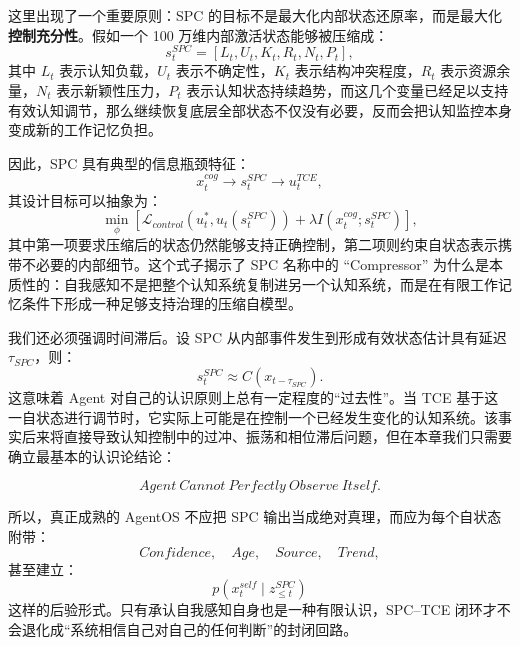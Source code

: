 这里出现了一个重要原则：SPC 的目标不是最大化内部状态还原率，而是最大化\textbf{控制充分性}。假如一个 100 万维内部激活状态能够被压缩成：
\begin{equation}
s_t^{SPC}
=
[
L_t,
U_t,
K_t,
R_t,
N_t,
P_t
],
\end{equation}
其中 $L_t$ 表示认知负载，$U_t$ 表示不确定性，$K_t$ 表示结构冲突程度，$R_t$ 表示资源余量，$N_t$ 表示新颖性压力，$P_t$ 表示认知状态持续趋势，而这几个变量已经足以支持有效认知调节，那么继续恢复底层全部状态不仅没有必要，反而会把认知监控本身变成新的工作记忆负担。

因此，SPC 具有典型的信息瓶颈特征：
\begin{equation}
x_t^{cog}
\rightarrow
s_t^{SPC}
\rightarrow
u_t^{TCE},
\end{equation}
其设计目标可以抽象为：
\begin{equation}
\min_{\phi}
\left[
\mathcal{L}_{control}
\left(
u_t^{*},
u_t(s_t^{SPC})
\right)
+
\lambda
I
\left(
x_t^{cog};
s_t^{SPC}
\right)
\right],
\label{eq:spc-information-bottleneck}
\end{equation}
其中第一项要求压缩后的状态仍然能够支持正确控制，第二项则约束自状态表示携带不必要的内部细节。这个式子揭示了 SPC 名称中的 ``Compressor'' 为什么是本质性的：自我感知不是把整个认知系统复制进另一个认知系统，而是在有限工作记忆条件下形成一种足够支持治理的压缩自模型。

我们还必须强调时间滞后。设 SPC 从内部事件发生到形成有效状态估计具有延迟 $\tau_{SPC}$，则：
\begin{equation}
s_t^{SPC}
\approx
C
\left(
x_{t-\tau_{SPC}}
\right).
\end{equation}
这意味着 Agent 对自己的认识原则上总有一定程度的``过去性''。当 TCE 基于这一自状态进行调节时，它实际上可能是在控制一个已经发生变化的认知系统。该事实后来将直接导致认知控制中的过冲、振荡和相位滞后问题，但在本章我们只需要确立最基本的认识论结论：

\begin{equation}
\boxed{
Agent\ Cannot\ Perfectly\ Observe\ Itself.
}
\end{equation}

所以，真正成熟的 AgentOS 不应把 SPC 输出当成绝对真理，而应为每个自状态附带：
\begin{equation}
Confidence,\quad
Age,\quad
Source,\quad
Trend,
\end{equation}
甚至建立：
\begin{equation}
p
\left(
x_t^{self}
\mid
z_{\leq t}^{SPC}
\right)
\end{equation}
这样的后验形式。只有承认自我感知自身也是一种有限认识，SPC--TCE 闭环才不会退化成``系统相信自己对自己的任何判断''的封闭回路。

